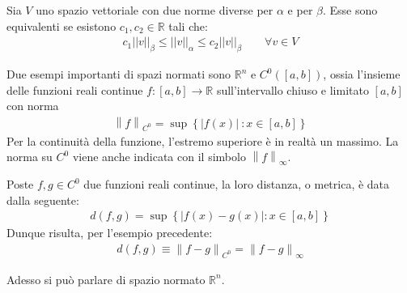 \documentclass[a4paper, oneside]{book}
\begin{document}
\begin{lemma}
    Sia $V$ uno spazio vettoriale con due norme diverse per $\alpha$
    e per $\beta$. Esse sono equivalenti se esistono
    $c_1, c_2 \in \mathbb{R}$ tali che:
    \begin{gather*}
        c_1||v||_{\beta} \leq ||v||_{\alpha} \leq c_2 ||v||_{\beta} \qquad \forall  v \in V
    \end{gather*}
\end{lemma}

\begin{example}
    Due esempi importanti di spazi normati sono $\mathbb{R}^{n}$ e $C^{0}([a, b])$, ossia
    l'insieme delle funzioni reali continue $f:[a, b] \to \mathbb{R}$ sull'intervallo chiuso 
    e limitato $[a, b]$ con norma
    \begin{align}
        \left\lVert f \right\rVert _{C^{0}} = \sup \left\{\left| f(x)  \right| \ : x \in [a, b] \right\}
    \end{align}
    Per la continuità della funzione, l'estremo superiore è in realtà un massimo. La norma
    su $C^{0}$ viene anche indicata con il simbolo $\left\lVert f \right\rVert _{\infty }$.  
\end{example}

\begin{definition}
    Poste $f, g \in C^{0}$ due funzioni reali continue, la loro distanza, o metrica, 
    è data dalla seguente:
    \begin{align}
        d(f, g) = \sup\left\{\left| f(x) - g(x)  \right| : x \in [a, b] \right\}
    \end{align}
    Dunque risulta, per l'esempio precedente:
    \begin{align}
        d(f, g) \equiv \left\lVert f - g \right\rVert _{C^{0}} = \left\lVert f - g \right\rVert   _{\infty }
    \end{align}
\end{definition} \noindent
Adesso si può parlare di spazio normato $\mathbb{R}^{n}$. 
\end{document}
